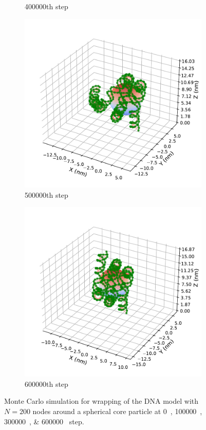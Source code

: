 \documentclass[a4paper,10pt]{article}
\begin{document}
\begin{figure}[tb]
\begin{subfigure}{.3\textwidth}
\caption{400000th step}
\label{fig:hist_c2}
\end{subfigure}
\begin{subfigure}{.3\textwidth}
\includegraphics[width=\textwidth]{hist_500000.pdf}
\caption{500000th step}
\label{fig:hist_c3}
\end{subfigure}
\begin{subfigure}{.3\textwidth}
\includegraphics[width=\textwidth]{hist_600000.pdf}
\caption{600000th step}
\label{fig:hist_d}
\end{subfigure}
\caption{Monte Carlo simulation for wrapping of the DNA model with $N=200$ nodes around a spherical core particle at \SIlist{0;100000;300000;600000}{} step.}
\label{fig:hist}
\end{figure}
\end{document}
